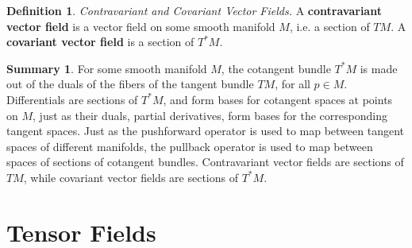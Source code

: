 \documentclass[10pt,landscape]{article}
\theoremstyle{definition}
\newtheorem{definition}{Definition}[section]
\theoremstyle{theorem}
\newtheorem{theorem}{Theorem}[section]
\theoremstyle{summary}
\newtheorem*{summary}{Summary}
\theoremstyle{remark}
\begin{document}
\begin{multicols*}{3}
\theoremstyle{definition}
\begin{definition}{\textit{Contravariant and Covariant Vector Fields.}}
    A \textbf{contravariant vector field} is a vector field on some smooth manifold $M$, i.e. a section of $TM$. A \textbf{covariant vector field} is a section of $T^*M$.
\end{definition}


\begin{summary}
    For some smooth manifold $M$, the cotangent bundle $T^*M$ is made out of the duals of the fibers of the tangent bundle $TM$, for all $p\in M$. Differentials are sections of $T^*M$, and form bases for cotangent spaces at points on $M$, just as their duals, partial derivatives, form bases for the corresponding tangent spaces. Just as the pushforward operator is used to map between tangent spaces of different manifolds, the pullback operator is used to map between spaces of sections of cotangent bundles. Contravariant vector fields are sections of $TM$, while covariant vector fields are sections of $T^*M$.
\end{summary}

\section{Tensor Fields}
 
\end{multicols*}
\end{document}
